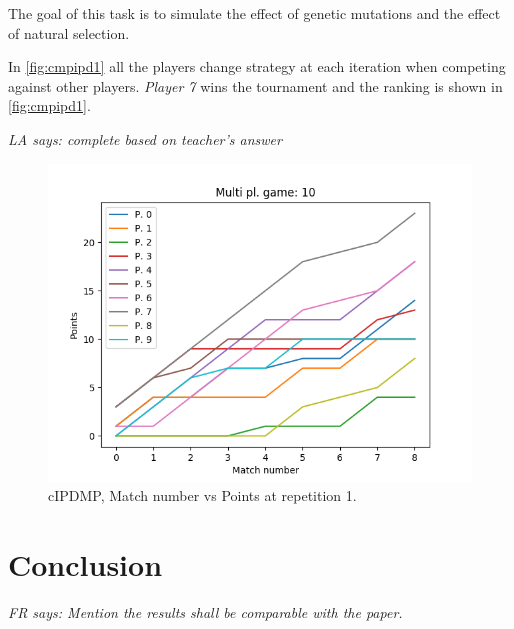 \documentclass[journal,a4paper,10pt,twoside]{IEEEtran}
\newcommand{\FR}[1]{\textit{\color{ForestGreen}FR says: #1}}
\newcommand{\LA}[1]{\textit{\color{orange}LA says: #1}}
\begin{document}
The goal of this task is to simulate the effect of genetic mutations and the effect of natural selection.

In \autoref{fig:cmpipd1} all the players change strategy at each iteration when competing against other players. \textit{Player 7} wins the tournament and the ranking is shown in \autoref{fig:cmpipd1}.

\LA{complete based on teacher's answer}

\begin{figure}[ht]
    \centering
    \includegraphics[width=1\columnwidth]{../img/cipdmp-scores-10.png}
    \caption{cIPDMP, Match number vs Points at repetition 1.}
    \label{fig:cmpipd1}
\end{figure}

\section{Conclusion} \label{s:conc}

\FR{Mention the results shall be comparable with the paper.}

%
%
\end{document}
